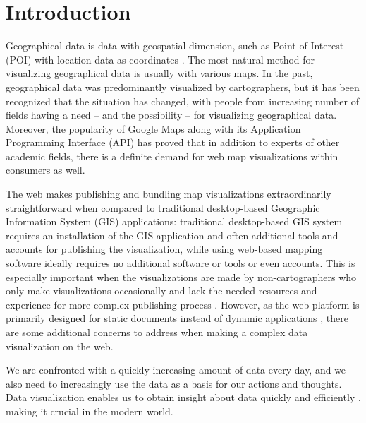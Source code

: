 
\chapter{Introduction}
\label{chapter:intro}


Geographical data is data with geospatial dimension, such as Point of Interest (POI) with location data as coordinates \citep[chap.~1.2]{kraak_cartography_2011}. The most natural method for visualizing geographical data is usually with various maps. In the past, geographical data was predominantly visualized by cartographers, but it has been recognized \citep{kraak_visualization_1999} that the situation has changed, with people from increasing number of fields having a need -- and the possibility \citep[chap.~1]{slocum_thematic_2014} -- for visualizing geographical data. Moreover, the popularity of Google Maps \citep{google_maps_2005-1} along with its Application Programming Interface (API) \citep{google_maps_2005} has proved that in addition to experts of other academic fields, there is a definite demand for web map visualizations within consumers as well. 

The web makes publishing and bundling map visualizations extraordinarily straightforward when compared to traditional desktop-based Geographic Information System (GIS) applications: traditional desktop-based GIS system requires an installation of the GIS application and often additional tools and accounts for publishing the visualization, while using web-based mapping software ideally requires no additional software or tools or even accounts. This is especially important when the visualizations are made by non-cartographers who only make visualizations occasionally and lack the needed resources and experience for more complex publishing process \citep{miller_beast_2006}. However, as the web platform is primarily designed for static documents \citep{berners-lee_information_1989,berners-lee_world-wide_1992} instead of dynamic applications \citep{jazayeri_trends_2007}, there are some additional concerns to address when making a complex data visualization on the web.

We are confronted with a quickly increasing amount of data every day, and we also need to increasingly use the data as a basis for our actions and thoughts. Data visualization enables us to obtain insight about data quickly and efficiently \citep{van_wijk_value_2005}, making it crucial in the modern world. 

